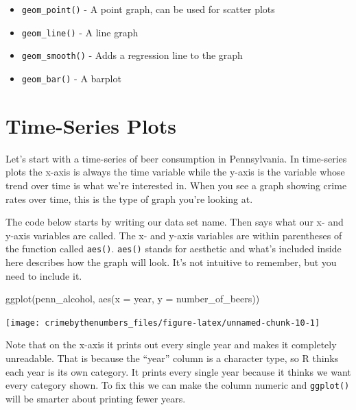 \documentclass[
]{krantz}
\makeatletter
\newenvironment{Shaded}{\begin{snugshade}}{\end{snugshade}}
\newcommand{\AttributeTok}[1]{\textcolor[rgb]{0.61,0.61,0.61}{#1}}
\newcommand{\FunctionTok}[1]{\textcolor[rgb]{0,0,0}{#1}}
\newcommand{\NormalTok}[1]{#1}
\providecommand{\tightlist}{%
  \setlength{\itemsep}{0pt}\setlength{\parskip}{0pt}}
\newenvironment{kframe}{%
\medskip{}
\setlength{\fboxsep}{.8em}
 \def\at@end@of@kframe{}%
 \ifinner\ifhmode%
  \def\at@end@of@kframe{\end{minipage}}%
  \begin{minipage}{\columnwidth}%
 \fi\fi%
 \def\FrameCommand##1{\hskip\@totalleftmargin \hskip-\fboxsep
 \colorbox{shadecolor}{##1}\hskip-\fboxsep
     \hskip-\linewidth \hskip-\@totalleftmargin \hskip\columnwidth}%
 \MakeFramed {\advance\hsize-\width
   \@totalleftmargin\z@ \linewidth\hsize
   \@setminipage}}%
 {\par\unskip\endMakeFramed%
 \at@end@of@kframe}
\renewenvironment{Shaded}{\begin{kframe}}{\end{kframe}}
\makeatother
\begin{document}
\begin{itemize}
\tightlist
\item
  \texttt{geom\_point()} - A point graph, can be used for scatter plots
\item
  \texttt{geom\_line()} - A line graph
\item
  \texttt{geom\_smooth()} - Adds a regression line to the graph
\item
  \texttt{geom\_bar()} - A barplot
\end{itemize}

\hypertarget{time-series-plots}{%
\section{Time-Series Plots}\label{time-series-plots}}

Let's start with a time-series of beer consumption in Pennsylvania. In time-series plots the x-axis is always the time variable while the y-axis is the variable whose trend over time is what we're interested in. When you see a graph showing crime rates over time, this is the type of graph you're looking at.

The code below starts by writing our data set name. Then says what our x- and y-axis variables are called. The x- and y-axis variables are within parentheses of the function called \texttt{aes()}. \texttt{aes()} stands for aesthetic and what's included inside here describes how the graph will look. It's not intuitive to remember, but you need to include it.

\begin{Shaded}
\begin{Highlighting}[]
\FunctionTok{ggplot}\NormalTok{(penn\_alcohol, }\FunctionTok{aes}\NormalTok{(}\AttributeTok{x =}\NormalTok{ year, }\AttributeTok{y =}\NormalTok{ number\_of\_beers))}
\end{Highlighting}
\end{Shaded}

\begin{center}\texttt{[image: crimebythenumbers\_files/figure-latex/unnamed-chunk-10-1]} \end{center}

Note that on the x-axis it prints out every single year and makes it completely unreadable. That is because the ``year'' column is a character type, so R thinks each year is its own category. It prints every single year because it thinks we want every category shown. To fix this we can make the column numeric and \texttt{ggplot()} will be smarter about printing fewer years.
\end{document}
